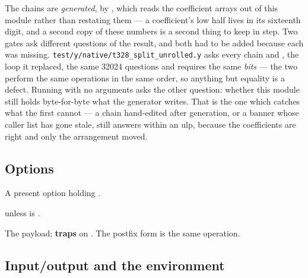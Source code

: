 \begin{description}[style=nextline,leftmargin=5.2em]
  The chains are \emph{generated}, by ,
  which reads the coefficient arrays out of this module rather than restating
  them --- a coefficient's low half lives in its sixteenth digit, and a second
  copy of these numbers is a second thing to keep in step. Two gates ask
  different questions of the result, and both had to be added because each was
  missing. \texttt{test/y/native/t328\_split\_unrolled.y} asks every chain and
  , the loop it replaced, the same \num{32024} questions and
  requires the same \emph{bits} --- the two perform the same operations in the
  same order, so anything but equality is a defect. Running 
  with no arguments asks the other question: whether this module still holds
  byte-for-byte what the generator writes. That is the one which catches what the
  first cannot --- a chain hand-edited after generation, or a banner whose
  caller list has gone stale, still answers within an ulp, because the
  coefficients are right and only the arrangement moved.
\end{description}

\subsection{Options}
\label{sec:builtin-option-b}

\begin{description}[style=nextline,leftmargin=5.2em]
\item[\ic{some(v)}] A present option holding .
\item[\ic{is\_some(v)}]  unless  is .
\item[\ic{unwrap(v)}] The payload; \textbf{traps} on . The
  postfix form  is the same operation.
\end{description}

\subsection{Input/output and the environment}
\label{sec:builtin-io}

